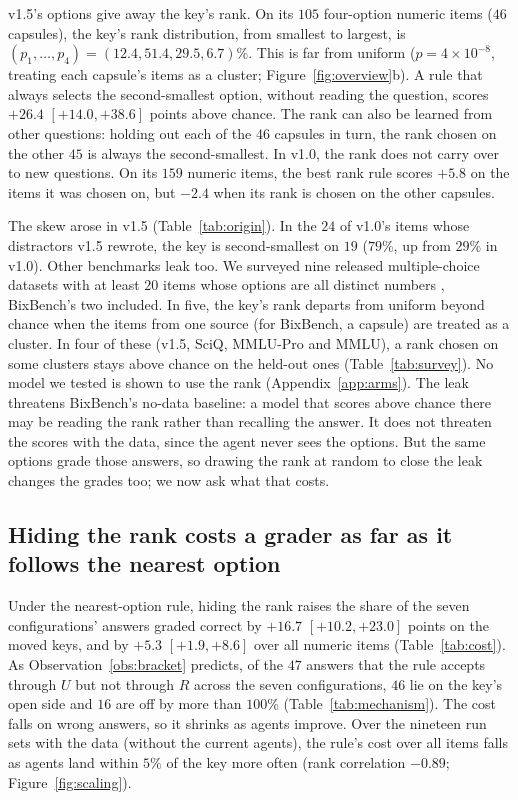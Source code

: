 \documentclass{article}
\begin{document}
v1.5's options give away the key's rank. On its $105$ four-option numeric items ($46$ capsules), the key's rank
distribution, from smallest to largest, is $(p_1,\dots,p_4)=(12.4,51.4,29.5,6.7)\%$. This is far from uniform
($p=4\times10^{-8}$, treating each capsule's items as a cluster; Figure~\ref{fig:overview}b). A rule that always
selects the second-smallest option, without reading the question, scores $+26.4$ $[+14.0,+38.6]$ points above chance.
The rank can also be learned from other questions: holding out each of the $46$ capsules in turn, the rank chosen on
the other $45$ is always the second-smallest. In v1.0, the rank does not carry over to new questions. On its $159$
numeric items, the best rank rule scores $+5.8$ on the items it was chosen on, but $-2.4$ when its rank is chosen on
the other capsules.

The skew arose in v1.5 (Table~\ref{tab:origin}). In the $24$ of v1.0's items whose distractors v1.5 rewrote, the key
is second-smallest on $19$ ($79\%$, up from $29\%$ in v1.0). Other benchmarks leak too. We surveyed nine released
multiple-choice datasets with at least $20$ items whose options are all distinct numbers
\citep{labbench,aquarat,medmcqa,medqa,mmlu,mmlupro,sciq}, BixBench's two included. In five, the key's rank departs
from uniform beyond chance when the items from one source (for BixBench, a capsule) are treated as a cluster. In four
of these (v1.5, SciQ, MMLU-Pro and MMLU), a rank chosen on some clusters stays above chance on the held-out ones
(Table~\ref{tab:survey}). No model we tested is shown to use the rank (Appendix~\ref{app:arms}). The leak threatens
BixBench's no-data baseline: a model that scores above chance there may be reading the rank rather than recalling the
answer. It does not threaten the scores with the data, since the agent never sees the options. But the same options
grade those answers, so drawing the rank at random to close the leak changes the grades too; we now ask what that
costs.

\subsection{Hiding the rank costs a grader as far as it follows the nearest option}
\label{sec:cost}

Under the nearest-option rule, hiding the rank raises the share of the seven configurations' answers graded correct by
$+16.7$ $[+10.2,+23.0]$ points on the moved keys, and by $+5.3$ $[+1.9,+8.6]$ over all numeric items
(Table~\ref{tab:cost}). As Observation~\ref{obs:bracket} predicts, of the $47$ answers that the rule accepts
through $U$ but not through $R$ across the seven configurations, $46$ lie on the key's open side and $16$ are off by
more than $100\%$ (Table~\ref{tab:mechanism}). The cost falls on wrong
answers, so it shrinks as agents improve. Over the nineteen run sets with the data (without the current agents),
the rule's cost over all items falls as agents land within $5\%$ of the key more often (rank correlation $-0.89$;
Figure~\ref{fig:scaling}).
\end{document}
